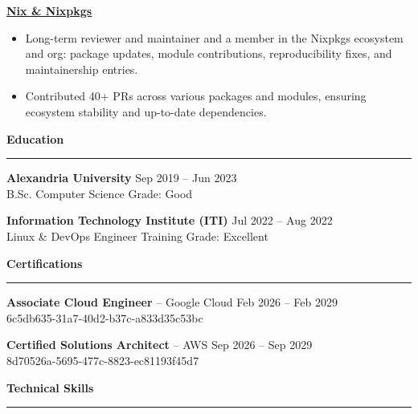 \documentclass[a4paper,9pt]{extarticle}
\newcommand{\cvsection}[1]{%
  \vspace{5pt}%
  {\normalsize\bfseries\textcolor{accent}{#1}}\\[-5pt]%
  \textcolor{accent}{\rule{\linewidth}{0.5pt}}%
  \vspace{4pt}%
}
\begin{document}
\textbf{\href{https://nixos.org}{Nix \& Nixpkgs}}\\
\begin{itemize}
	\item Long-term reviewer and maintainer and a member in the Nixpkgs ecosystem and org: package updates, module contributions, reproducibility fixes, and maintainership entries.
	\item Contributed 40+ PRs across various packages and modules, ensuring ecosystem stability and up-to-date dependencies.
\end{itemize}

\cvsection{Education}

\textbf{Alexandria University} \hfill {\footnotesize\textcolor{muted}{Sep 2019 -- Jun 2023}}\\
{\footnotesize B.Sc. Computer Science \hfill \textcolor{muted}{Grade: Good}}

\vspace{4pt}

\textbf{Information Technology Institute (ITI)} \hfill {\footnotesize\textcolor{muted}{Jul 2022 -- Aug 2022}}\\
{\footnotesize Linux \& DevOps Engineer Training \hfill \textcolor{muted}{Grade: Excellent}}

\cvsection{Certifications}

\textbf{Associate Cloud Engineer} -- Google Cloud \hfill {\footnotesize\textcolor{muted}{Feb 2026 -- Feb 2029}}\\
{\footnotesize\textcolor{muted}{6c5db635-31a7-40d2-b37c-a833d35c53bc}}

\textbf{Certified Solutions Architect} -- AWS \hfill {\footnotesize\textcolor{muted}{Sep 2026 -- Sep 2029}}\\
{\footnotesize\textcolor{muted}{8d70526a-5695-477c-8823-ec81193f45d7}}

\cvsection{Technical Skills}
\end{document}
